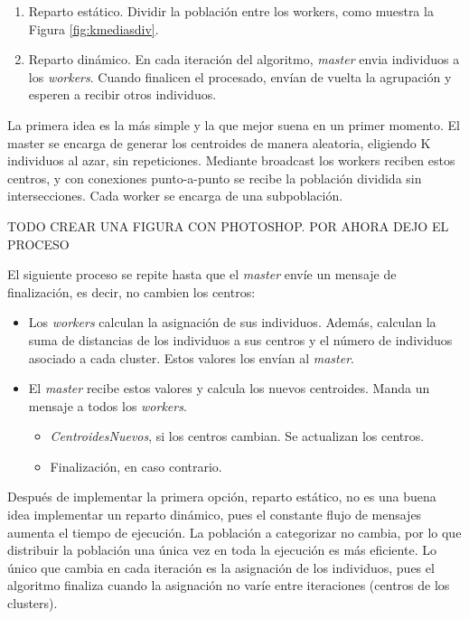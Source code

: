 		
		
		\begin{enumerate}
			\item Reparto estático. Dividir la población entre los workers, como muestra la Figura \ref{fig:kmediasdiv}. 
			\item Reparto dinámico. En cada iteración del algoritmo, \textit{master} envia individuos a los \textit{workers}. Cuando finalicen el procesado, envían de vuelta la agrupación y esperen a recibir otros individuos. 
		\end{enumerate}
		
		La primera idea es la más simple y la que mejor suena en un primer momento. El master se encarga de generar los centroides de manera aleatoria, eligiendo K individuos al azar, sin repeticiones. Mediante broadcast los workers reciben estos centros, y con conexiones punto-a-punto se recibe la población dividida sin intersecciones. Cada worker se encarga de una subpoblación. 
		
		
		\color{blue} TODO CREAR UNA FIGURA CON PHOTOSHOP. POR AHORA DEJO EL PROCESO \color{black}
		
		\begin{mdframed}[roundcorner=5pt]
			El siguiente proceso se repite hasta que el \textit{master} envíe un mensaje de finalización, es decir, no cambien los centros:	
			\begin{itemize}
				\setlength\itemsep{0em} %
				\item Los \textit{workers} calculan la asignación de sus individuos. Además, calculan la suma de distancias de los individuos a sus centros y el número de individuos asociado a cada cluster. Estos valores los envían al \textit{master}.
				\item El \textit{master} recibe estos valores y calcula los nuevos centroides. Manda un mensaje a todos los \textit{workers}. 
				\begin{itemize}
					\setlength\itemsep{0em} %
					\item \textit{CentroidesNuevos}, si los centros cambian. Se actualizan los centros.
					\item Finalización, en caso contrario.
				\end{itemize}
			\end{itemize}
		\end{mdframed}
		
	
		
		Después de implementar la primera opción, reparto estático, no es una buena idea implementar un reparto dinámico, pues el constante flujo de mensajes aumenta el tiempo de ejecución. La población a categorizar no cambia, por lo que distribuir la población una única vez en toda la ejecución es más eficiente. Lo único que cambia en cada iteración es la asignación de los individuos, pues el algoritmo finaliza cuando la asignación no varíe entre iteraciones (centros de los clusters).
		
